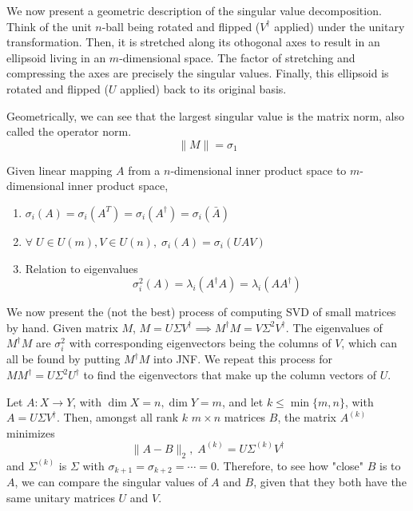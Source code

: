   We now present a geometric description of the singular value decomposition. Think of the unit $n$-ball being rotated and flipped ($V^\dagger$ applied) under the unitary transformation. Then, it is stretched along its othogonal axes to result in an ellipsoid living in an $m$-dimensional space. The factor of stretching and compressing the axes are precisely the singular values. Finally, this ellipsoid is rotated and flipped ($U$ applied) back to its original basis. 

  \begin{theorem}
    Geometrically, we can see that the largest singular value is the matrix norm, also called the operator norm. 
    \begin{equation}
      \|M\| = \sigma_1
    \end{equation}
  \end{theorem}

  \begin{theorem} 
    Given linear mapping $A$ from a $n$-dimensional inner product space to $m$-dimensional inner product space, 
    \begin{enumerate}
      \item $\sigma_i(A) = \sigma_i (A^T) = \sigma_i (A^\dagger) = \sigma_i (\bar{A})$

      \item $\forall \; U \in U(m), V \in U(n), \; \sigma_i (A) = \sigma_i (U A V)$

      \item Relation to eigenvalues
      \begin{equation}
        \sigma_i^2(A) = \lambda_i (A^\dagger A) = \lambda_i (A A^\dagger)
      \end{equation}
    \end{enumerate}
  \end{theorem}

  We now present the (not the best) process of computing SVD of small matrices by hand. Given matrix $M$, $M = U \Sigma V^\dagger \implies M^\dagger M = V \Sigma^2 V^\dagger$. The eigenvalues of $M^\dagger M$ are $\sigma_i^2$ with corresponding eigenvectors being the columns of $V$, which can all be found by putting $M^\dagger M$ into JNF. We repeat this process for $M M^\dagger = U \Sigma^2 U^\dagger$ to find the eigenvectors that make up the column vectors of $U$. 

  \begin{theorem}
    Let $A: X \longrightarrow Y$, with $\dim{X} = n, \dim{Y} = m$, and let $k \leq \min{\{m, n\}}$, with $A = U \Sigma V^\dagger$. Then, amongst all rank $k$ $m \times n$ matrices $B$, the matrix $A^{(k)}$ minimizes 
    \begin{equation}
      \|A-B\|_2, \; A^{(k)} = U \Sigma^{(k)} V^\dagger
    \end{equation}
    and $\Sigma^{(k)}$ is $\Sigma$ with $\sigma_{k+1} = \sigma_{k+2} = \cdots = 0$. Therefore, to see how "close" $B$ is to $A$, we can compare the singular values of $A$ and $B$, given that they both have the same unitary matrices $U$ and $V$. 
  \end{theorem}

